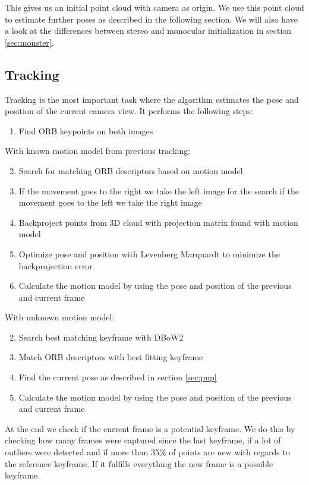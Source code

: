 \documentclass[11pt,a4paper,titlepage,oneside]{report}
\begin{document}
This gives us an initial point cloud with camera as origin. We use this point cloud to estimate further poses as described in the following section. We will also have a look at the differences between stereo and monocular initialization in section \ref{sec:monster}.

\subsection{Tracking}

Tracking is the most important task where the algorithm estimates the pose and position of the current camera view. It performs the following steps:
\begin{enumerate}
	\item Find ORB keypoints on both images
\end{enumerate}

With known motion model from previous tracking:
\begin{enumerate}
	\setcounter{enumi}{1}
	\item Search for matching ORB descriptors based on motion model
	\item If the movement goes to the right we take the left image for the search if the movement goes to the left we take the right image
	\item Backproject points from 3D cloud with projection matrix found with motion model
	\item Optimize pose and position with Levenberg Marquardt \cite{levenbergmarquardt} to minimize the backprojection error
	\item Calculate the motion model by using the pose and position of the previous and current frame
\end{enumerate}

With unknown motion model:
\begin{enumerate}
	\setcounter{enumi}{1}
	\item Search best matching keyframe with DBoW2 \cite{dbow}
	\item Match ORB descriptors with best fitting keyframe
	\item Find the current pose as described in section \ref{sec:pnp}
	\item Calculate the motion model by using the pose and position of the previous and current frame
\end{enumerate}

At the end we check if the current frame is a potential keyframe. We do this by checking how many frames were captured since the last keyframe, if a lot of outliers were detected and if more than 35\% of points are new with regards to the reference keyframe. If it fulfills everything the new frame is a possible keyframe.\\
\end{document}
